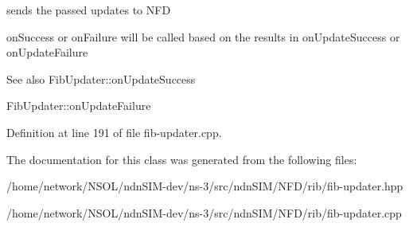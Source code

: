 sends the passed updates to N\+FD 

on\+Success or on\+Failure will be called based on the results in on\+Update\+Success or on\+Update\+Failure

\begin{DoxySeeAlso}{See also}
Fib\+Updater\+::on\+Update\+Success 

Fib\+Updater\+::on\+Update\+Failure 
\end{DoxySeeAlso}


Definition at line 191 of file fib-\/updater.\+cpp.



The documentation for this class was generated from the following files\+:\begin{DoxyCompactItemize}
\item 
/home/network/\+N\+S\+O\+L/ndn\+S\+I\+M-\/dev/ns-\/3/src/ndn\+S\+I\+M/\+N\+F\+D/rib/fib-\/updater.\+hpp\item 
/home/network/\+N\+S\+O\+L/ndn\+S\+I\+M-\/dev/ns-\/3/src/ndn\+S\+I\+M/\+N\+F\+D/rib/fib-\/updater.\+cpp\end{DoxyCompactItemize}

